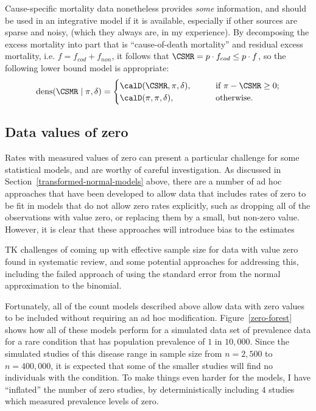 Cause-specific mortality data nonetheless provides \emph{some}
information, and should be used in an integrative model if it is
available, especially if other sources are sparse and noisy, (which
they always are, in my experience).  By decomposing the excess
mortality into part that is ``cause-of-death mortality'' and residual
excess mortality, i.e. $f = f_{cod} + f_{non}$, it follows that $\CSMR
=p \cdot f_{cod} \leq p\cdot f$, so the following lower bound model is
appropriate:
\[
\dens(\CSMR \given \pi,\delta) =
\begin{cases}
  \calD(\CSMR, \pi, \delta), &\qquad\text{if } \pi-\CSMR \geq 0;\\
  \calD(\pi, \pi, \delta), &\qquad\text{otherwise.}
\end{cases} 
\]

\subsection{Data values of zero}
Rates with measured values of zero can present a particular challenge
for some statistical models, and are worthy of careful
investigation. As discussed in Section~\ref{transformed-normal-models}
above, there are a number of ad hoc approaches that have been
developed to allow data that includes rates of zero to be fit in
models that do not allow zero rates explicitly, such as dropping all
of the observations with value zero, or replacing them by a small, but
non-zero value. However, it is clear that these approaches will
introduce bias to the estimates \cite{refs TK}

TK challenges of coming up with effective sample size for data with
value zero found in systematic review, and some potential approaches
for addressing this, including the failed approach of using the
standard error from the normal approximation to the binomial.

Fortunately, all of the count models described above allow data with
zero values to be included without requiring an ad hoc
modification. Figure~\ref{zero-forest} shows how all of these models
perform for a simulated data set of prevalence data for a rare
condition that has population prevalence of $1$ in $10,000$.  Since
the simulated studies of this disease range in sample size from
$n=2,500$ to $n=400,000$, it is expected that some of the smaller
studies will find no individuals with the condition. To make things
even harder for the models, I have ``inflated'' the number of zero
studies, by deterministically including $4$ studies which measured
prevalence levels of zero.

